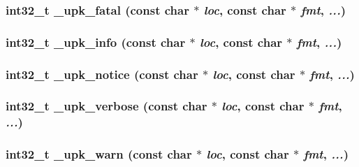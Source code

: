 \subsubsection{\setlength{\rightskip}{0pt plus 5cm}int32\_\-t \_\-upk\_\-fatal (const char $\ast$ {\em loc}, const char $\ast$ {\em fmt},  {\em ...})}\label{group__upk__errors_ga11134260b012f96fc073dfc5c39574a}


\subsubsection{\setlength{\rightskip}{0pt plus 5cm}int32\_\-t \_\-upk\_\-info (const char $\ast$ {\em loc}, const char $\ast$ {\em fmt},  {\em ...})}\label{group__upk__errors_ge56db4cbb80ff000f71af11f7c9c8dd0}


\subsubsection{\setlength{\rightskip}{0pt plus 5cm}int32\_\-t \_\-upk\_\-notice (const char $\ast$ {\em loc}, const char $\ast$ {\em fmt},  {\em ...})}\label{group__upk__errors_g209d10f415e378f29251efcfb6128c1a}


\subsubsection{\setlength{\rightskip}{0pt plus 5cm}int32\_\-t \_\-upk\_\-verbose (const char $\ast$ {\em loc}, const char $\ast$ {\em fmt},  {\em ...})}\label{group__upk__errors_g7a032fe31ee3880364b9e65253f08a83}


\subsubsection{\setlength{\rightskip}{0pt plus 5cm}int32\_\-t \_\-upk\_\-warn (const char $\ast$ {\em loc}, const char $\ast$ {\em fmt},  {\em ...})}\label{group__upk__errors_g615114c3b21d0966289b9010e1531c4c}


